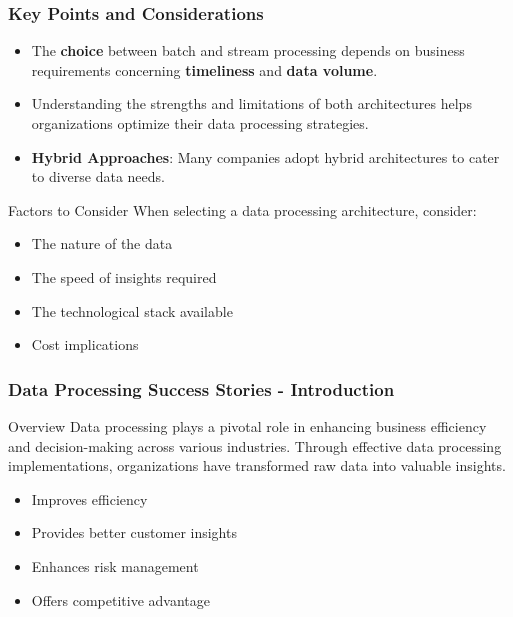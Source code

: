 \documentclass[aspectratio=169]{beamer}
\begin{document}
\begin{frame}[fragile]
    \frametitle{Key Points and Considerations}
    
    \begin{itemize}
        \item The \textbf{choice} between batch and stream processing depends on business requirements concerning \textbf{timeliness} and \textbf{data volume}.
        
        \item Understanding the strengths and limitations of both architectures helps organizations optimize their data processing strategies.
        
        \item \textbf{Hybrid Approaches}: Many companies adopt hybrid architectures to cater to diverse data needs.
    \end{itemize}

    \begin{block}{Factors to Consider}
        When selecting a data processing architecture, consider:
        \begin{itemize}
            \item The nature of the data
            \item The speed of insights required
            \item The technological stack available
            \item Cost implications
        \end{itemize}
    \end{block}
\end{frame}

\begin{frame}[fragile]
    \frametitle{Data Processing Success Stories - Introduction}
    \begin{block}{Overview}
        Data processing plays a pivotal role in enhancing business efficiency and decision-making across various industries. 
        Through effective data processing implementations, organizations have transformed raw data into valuable insights.
    \end{block}
    
    \begin{itemize}
        \item Improves efficiency
        \item Provides better customer insights
        \item Enhances risk management
        \item Offers competitive advantage
    \end{itemize}
\end{frame}
\end{document}
